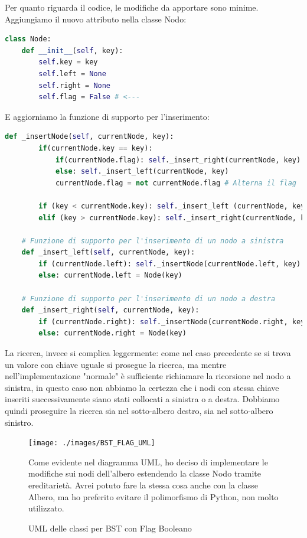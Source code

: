 \documentclass{article}
\begin{document}
Per quanto riguarda il codice, le modifiche da apportare sono minime.
Aggiungiamo il nuovo attributo nella classe Nodo:

\begin{lstlisting}[language=Python, caption={Classe nodo di un BST con Flag Booleano}]
class Node:
    def __init__(self, key):
        self.key = key
        self.left = None
        self.right = None
        self.flag = False # <---
\end{lstlisting}

E aggiorniamo la funzione di supporto per l'inserimento:

\begin{lstlisting}[language=Python]
    def _insertNode(self, currentNode, key):        
        if(currentNode.key == key):
            if(currentNode.flag): self._insert_right(currentNode, key)
            else: self._insert_left(currentNode, key)
            currentNode.flag = not currentNode.flag # Alterna il flag
    
        if (key < currentNode.key): self._insert_left (currentNode, key)
        elif (key > currentNode.key): self._insert_right(currentNode, key)

    # Funzione di supporto per l'inserimento di un nodo a sinistra
    def _insert_left(self, currentNode, key):
        if (currentNode.left): self._insertNode(currentNode.left, key)
        else: currentNode.left = Node(key)

    # Funzione di supporto per l'inserimento di un nodo a destra
    def _insert_right(self, currentNode, key):
        if (currentNode.right): self._insertNode(currentNode.right, key)
        else: currentNode.right = Node(key)
\end{lstlisting}



La ricerca, invece si complica leggermente: come nel caso precedente se si trova un valore con chiave uguale si prosegue la ricerca, ma mentre nell'implementazione "normale" è sufficiente richiamare la ricorsione nel nodo a sinistra, in questo caso non abbiamo la certezza che i nodi con stessa chiave inseriti successivamente siano stati collocati a sinistra o a destra. Dobbiamo quindi proseguire la ricerca sia nel sotto-albero destro, sia nel sotto-albero sinistro.

\begin{figure}[htbp]
  \begin{minipage}{0.5\textwidth}
    \centering
    \texttt{[image: ./images/BST\_FLAG\_UML]}
    \caption{UML delle classi per BST con Flag Booleano}
    \label{fig:BST_FLAG_UML}
  \end{minipage}%
    \hspace{\columnsep}
      \hspace{\columnsep}
  \begin{minipage}{0.5\textwidth}
	Come evidente nel diagramma UML, ho deciso di implementare le modifiche sui nodi dell'albero estendendo la classe Nodo tramite ereditarietà. Avrei potuto fare la stessa cosa anche con la classe Albero, ma ho preferito evitare il polimorfismo di Python, non molto utilizzato.
  \end{minipage}
\end{figure}
\end{document}
